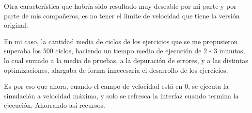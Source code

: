 Otra característica que habría sido resultado muy deseable por mi parte y por parte de mis compañeros, 
es no tener el limite de velocidad que tiene la versión original.

\bigskip
En mi caso, la cantidad media de ciclos de los ejercicios que se me propusieron superaba los 500 ciclos,
 haciendo un tiempo medio de ejecución de 2 - 3 minutos, lo cual sumado a 
la media de pruebas, a la depuración de errores, y a las distintas optimizaciones, 
alargaba de forma innecesaria el desarrollo de los ejercicios.

\bigskip
Es por eso que ahora, cuando el campo de velocidad está en 0, se ejecuta la simulación a velocidad 
máxima, y solo se refresca la interfaz cuando termina la ejecución. Ahorrando así 
recursos. 